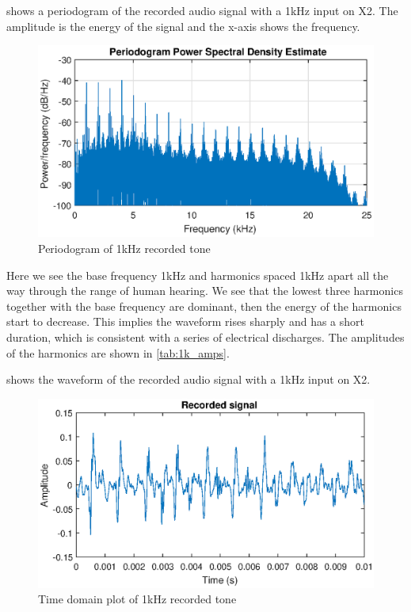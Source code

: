 





 shows a periodogram of the recorded audio signal with a 1kHz input on X2. The amplitude is the energy of the signal and the x-axis shows the frequency.
\begin{figure}[H]
    \centering
    \includegraphics[trim={0cm 1.6cm 0cm 2cm},clip,width=\textwidth]{img/Periodogram_1khz-09.eps}
    \caption{Periodogram of 1kHz recorded tone}
    \label{fig:period_1k}
\end{figure}

Here we see the base frequency 1kHz and harmonics spaced 1kHz apart all the way through the range of human hearing. We see that the lowest three harmonics together with the base frequency are dominant, then the energy of the harmonics start to decrease. This implies the waveform rises sharply and has a short duration, which is consistent with a series of electrical discharges. The amplitudes of the harmonics are shown in \cref{tab:1k_amps}.

 shows the waveform of the recorded audio signal with a 1kHz input on X2.

\begin{figure}[H]
    \centering
    \includegraphics[trim={0cm 1.6cm 0cm 2cm},clip,width=\textwidth]{img/Recorded_1khz-09.eps}
    \caption{Time domain plot of 1kHz recorded tone}
    \label{fig:recorded_1k}
\end{figure}

